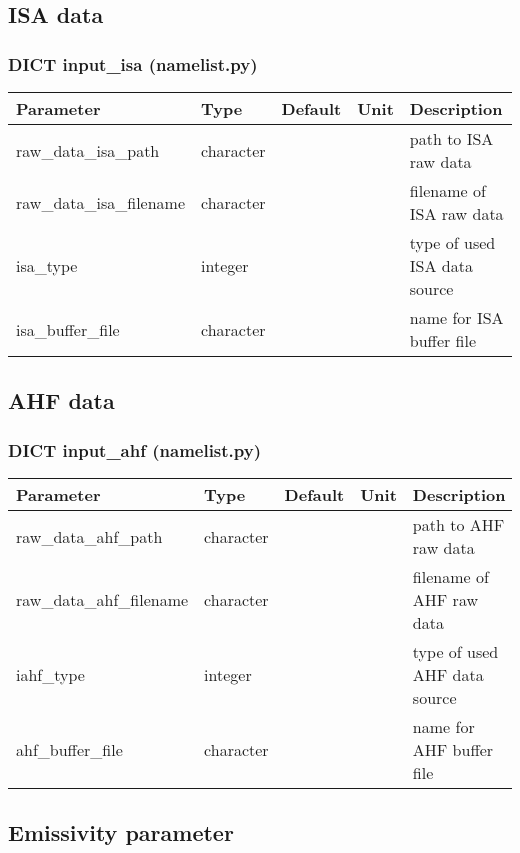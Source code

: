 \documentclass[a4paper,10pt,DIV14,BCOR1cm,titlepage,twoside]{scrartcl}
\providecommand{\tabularnewline}{\\}
\begin{document}
\subsection{ISA data}\label{namelist_input_for_extpar_isa}

\subsubsection*{DICT input\_isa (namelist.py)}

\begin{longtable}{|p{4cm}|p{1.5cm}|p{1.5cm}|p{1cm}|p{6cm}|}
\hline 
\textbf{Parameter}& \textbf{Type}& \textbf{Default}& \textbf{Unit}& \textbf{Description}
\tabularnewline
\hline
\endhead
\hline 
raw\_data\_isa\_path & character & &  & path to ISA raw data \tabularnewline
\hline 
raw\_data\_isa\_filename & character & &  & filename of ISA raw data \tabularnewline
\hline
isa\_type & integer &   &  & type of used ISA data source \tabularnewline
\hline
isa\_buffer\_file & character & &  & name for ISA buffer file
\tabularnewline
\bottomrule
\end{longtable}

\subsection{AHF data}\label{namelist_input_for_extpar_ahf}

\subsubsection*{DICT input\_ahf (namelist.py)}

\begin{longtable}{|p{4cm}|p{1.5cm}|p{1.5cm}|p{1cm}|p{6cm}|}
\hline 
\textbf{Parameter}& \textbf{Type}& \textbf{Default}& \textbf{Unit}& \textbf{Description}
\tabularnewline
\hline
\endhead
\hline 
raw\_data\_ahf\_path & character & &  & path to AHF raw data \tabularnewline
\hline 
raw\_data\_ahf\_filename & character & &  & filename of AHF raw data \tabularnewline
\hline
iahf\_type & integer &   &  & type of used AHF data source \tabularnewline
\hline
ahf\_buffer\_file & character & &  & name for AHF buffer file
\tabularnewline
\bottomrule
\end{longtable}

\subsection{Emissivity parameter}\label{namelist_input_for_extpar_emissivity}
\end{document}
